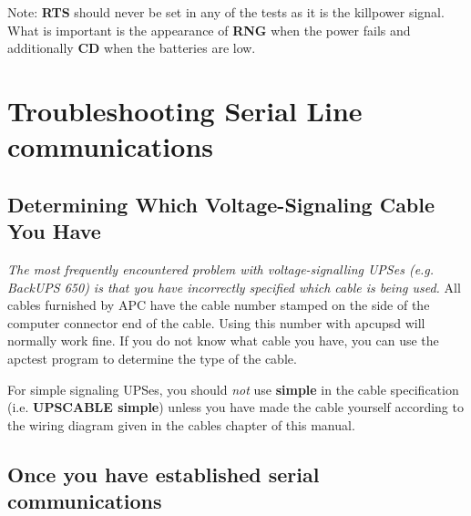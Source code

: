 {{{{{{{Note: {\bf RTS} should never be set in any of the tests as it is the killpower
signal. What is important is the appearance of {\bf RNG} when the power fails
and additionally {\bf CD} when the batteries are low. 

\label{Troubleshooting-Serial-Line-communications}

\section*{Troubleshooting Serial Line communications}

\label{index-Problems_002c-Serial-228}
\label{index-Serial-Problems-229}

\label{Determining-Which-Voltage_002dSignaling-Cable-You-Have}

\subsection*{Determining Which Voltage-Signaling Cable You Have}

{\it The most frequently encountered problem with voltage-signalling UPSes
(e.g. BackUPS 650) is that you have incorrectly specified which cable is being
used.} All cables furnished by APC have the cable number stamped on the side
of the computer connector end of the cable. Using this number with apcupsd
will normally work fine. If you do not know what cable you have, you can use
the apctest program to determine the type of the cable.  

For simple signaling UPSes, you should {\it not} use {\bf simple} in the cable
specification (i.e. {\bf UPSCABLE simple}) unless you have made the cable
yourself according to the wiring diagram given in the cables chapter of this
manual. 

\label{Once-you-have-established-serial-communications}

\subsection*{Once you have established serial communications}

}}}}}}}
